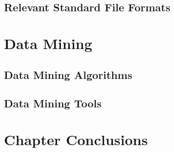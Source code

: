 \subsection{Relevant Standard File Formats}\label{sec:formats}

\section{Data Mining}\label{sec:mlearning}

\subsection{Data Mining Algorithms}\label{sec:minalgo}

\subsection{Data Mining Tools}\label{sec:mintools}

\section{Chapter Conclusions}
